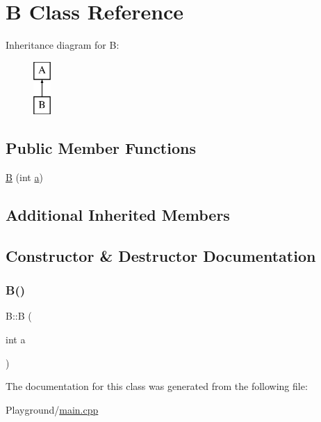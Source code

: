 \hypertarget{class_b}{}\section{B Class Reference}
\label{class_b}
Inheritance diagram for B\+:\begin{figure}[H]
\begin{center}
\leavevmode
\includegraphics[height=2.000000cm]{class_b}
\end{center}
\end{figure}
\subsection*{Public Member Functions}
\begin{DoxyCompactItemize}
\item 
\mbox{\hyperlink{class_b_a649478177af5ec5962deac6fbbc6510b}{B}} (int \mbox{\hyperlink{class_a_a49a53415abd8f1b26235579cc805a15f}{a}})
\end{DoxyCompactItemize}
\subsection*{Additional Inherited Members}


\subsection{Constructor \& Destructor Documentation}
\mbox{\label{class_b_a649478177af5ec5962deac6fbbc6510b}} 
\subsubsection{\texorpdfstring{B()}{B()}}
{\footnotesize\ttfamily B\+::B (\begin{DoxyParamCaption}\item[{int}]{a }\end{DoxyParamCaption})\hspace{0.3cm}{\ttfamily [inline]}}



The documentation for this class was generated from the following file\+:\begin{DoxyCompactItemize}
\item 
Playground/\mbox{\hyperlink{_playground_2main_8cpp}{main.\+cpp}}\end{DoxyCompactItemize}
